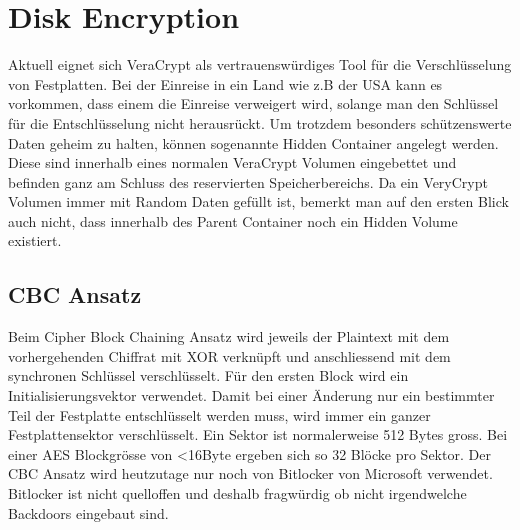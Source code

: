 \section{Disk Encryption}
Aktuell eignet sich VeraCrypt als vertrauenswürdiges Tool für die Verschlüsselung von Festplatten. Bei der Einreise in ein Land wie z.B der USA kann es vorkommen, dass einem die Einreise verweigert wird, solange man den Schlüssel für die Entschlüsselung nicht herausrückt. Um trotzdem besonders schützenswerte Daten geheim zu halten, können sogenannte Hidden Container angelegt werden. Diese sind innerhalb eines normalen VeraCrypt Volumen eingebettet und befinden ganz am Schluss des reservierten Speicherbereichs. Da ein VeryCrypt Volumen immer mit Random Daten gefüllt ist, bemerkt man auf den ersten Blick auch nicht, dass innerhalb des Parent Container noch ein Hidden Volume existiert.

\subsection{CBC Ansatz}
Beim Cipher Block Chaining Ansatz wird jeweils der Plaintext mit dem vorhergehenden Chiffrat mit XOR verknüpft und anschliessend mit dem synchronen Schlüssel verschlüsselt. Für den ersten Block wird ein Initialisierungsvektor verwendet. Damit bei einer Änderung nur ein bestimmter Teil der Festplatte entschlüsselt werden muss, wird immer ein ganzer Festplattensektor verschlüsselt. Ein Sektor ist normalerweise 512 Bytes gross. Bei einer AES Blockgrösse von <16Byte ergeben sich so 32 Blöcke pro Sektor. Der CBC Ansatz wird heutzutage nur noch von Bitlocker von Microsoft verwendet. Bitlocker ist nicht quelloffen und deshalb fragwürdig ob nicht irgendwelche Backdoors eingebaut sind.


